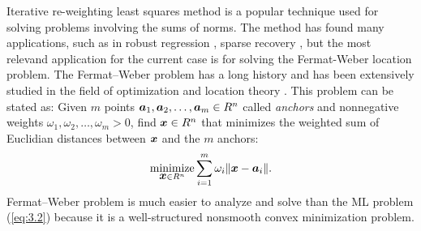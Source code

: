 
Iterative re-weighting least squares method is a popular technique used for solving problems involving the sums of norms. The method has found many applications, such as in robust regression \cite{GIRLS, RReg}, sparse recovery \cite{Daub}, but the most relevand application for the current case is for solving the Fermat-Weber location problem. The Fermat--Weber problem %
has a long history and has been extensively studied in the field of optimization and location theory \cite{GIRLS}. This problem can be stated as: Given $m$ points $\mbox{\boldmath$a$}_1, \mbox{\boldmath$a$}_2, \ldots, \mbox{\boldmath$a$}_m \in R^n$ called \textit{anchors} and nonnegative weights $\omega_1, \omega_2, \ldots, \omega_m > 0$, find $\mbox{\boldmath$x$} \in R^n$ that minimizes the weighted sum of Euclidian distances between $\mbox{\boldmath$x$}$ and the $m$ anchors:
\begin{equation} \label{eq:FW}
\nonumber
\mathop{\mbox{minimize}}_{\mbox{\boldmath$x$} \in R^n} \sum_{i=1}^{m} \omega_i\|\mbox{\boldmath$x$} - \mbox{\boldmath$a$}_i\|.
\end{equation}
Fermat--Weber problem is much easier to analyze and solve than the ML problem (\ref{eq:3.2}) because it is a well-structured nonsmooth convex minimization problem. 
